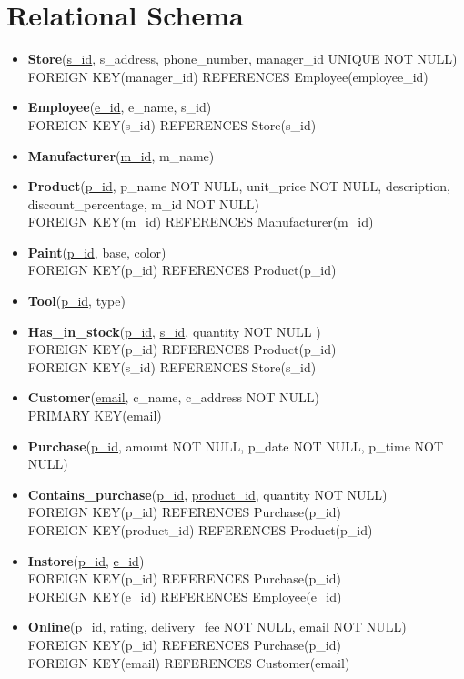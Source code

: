 \documentclass[a4paper,11pt]{article}
\begin{document}
\section{Relational Schema}
\begin{itemize}
    \item \textbf{Store}(\underline{s\_id}, s\_address, phone\_number, manager\_id UNIQUE NOT NULL)\\
        FOREIGN KEY(manager\_id) REFERENCES Employee(employee\_id)
    \item \textbf{Employee}(\underline{e\_id}, e\_name, s\_id)\\
        FOREIGN KEY(s\_id) REFERENCES Store(s\_id)
    \item \textbf{Manufacturer}(\underline{m\_id}, m\_name)
    \item \textbf{Product}(\underline{p\_id}, p\_name NOT NULL, unit\_price NOT NULL, description,\\ discount\_percentage, m\_id NOT NULL)\\
        FOREIGN KEY(m\_id) REFERENCES Manufacturer(m\_id)
    \item \textbf{Paint}(\underline{p\_id}, base, color)\\
        FOREIGN KEY(p\_id) REFERENCES Product(p\_id)
    \item \textbf{Tool}(\underline{p\_id}, type)
    \item \textbf{Has\_in\_stock}(\underline{p\_id}, \underline{s\_id}, quantity NOT NULL )\\
        FOREIGN KEY(p\_id) REFERENCES Product(p\_id)\\
        FOREIGN KEY(s\_id) REFERENCES Store(s\_id)
    \item \textbf{Customer}(\underline{email}, c\_name, c\_address NOT NULL)\\
        PRIMARY KEY(email)
    \item \textbf{Purchase}(\underline{p\_id}, amount NOT NULL, p\_date NOT NULL, p\_time NOT NULL)
    \item \textbf{Contains\_purchase}(\underline{p\_id}, \underline{product\_id}, quantity NOT NULL)\\
        FOREIGN KEY(p\_id) REFERENCES Purchase(p\_id)\\
        FOREIGN KEY(product\_id) REFERENCES Product(p\_id)
    \item \textbf{Instore}(\underline{p\_id}, \underline{e\_id})\\
        FOREIGN KEY(p\_id) REFERENCES Purchase(p\_id)\\
        FOREIGN KEY(e\_id) REFERENCES Employee(e\_id)
    \item \textbf{Online}(\underline{p\_id}, rating, delivery\_fee NOT NULL, email NOT NULL)\\
        FOREIGN KEY(p\_id) REFERENCES Purchase(p\_id)\\
        FOREIGN KEY(email) REFERENCES Customer(email)


\end{itemize}
\end{document}
